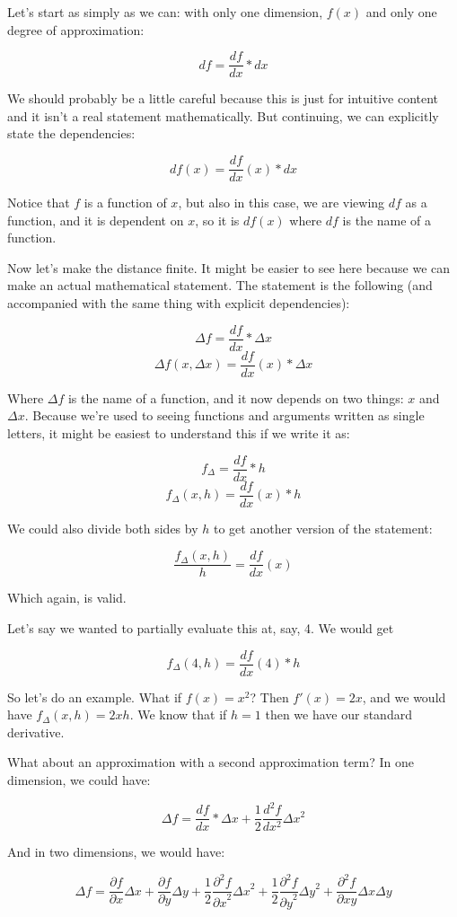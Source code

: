 \documentclass{article}
\begin{document}
Let's start as simply as we can: with only one dimension, $f(x)$ and only one degree of approximation:

$$df = \frac{df}{dx} * dx$$

We should probably be a little careful because this is just for intuitive content and it isn't a real statement mathematically.  But continuing, we can explicitly state the dependencies:

$$df(x) = \frac{df}{dx}(x) * dx$$

Notice that $f$ is a function of $x$, but also in this case, we are viewing $df$ as a function, and it is dependent on $x$, so it is $df(x)$ where $df$ is the name of a function.

Now let's make the distance finite. It might be easier to see here because we can make an actual mathematical statement.  The statement is the following (and accompanied with the same thing with explicit dependencies):

$$\Delta f = \frac{df}{dx} * \Delta x$$
$$\Delta f(x, \Delta x) = \frac{df}{dx}(x) * \Delta x$$

Where $\Delta f$ is the name of a function, and it now depends on two things: $x$ and $\Delta x$.  Because we're used to seeing functions and arguments written as single letters, it might be easiest to understand this if we write it as:

$$ f_\Delta = \frac{df}{dx} * h$$
$$ f_\Delta(x, h) = \frac{df}{dx}(x) * h$$



We could also divide both sides by $h$ to get another version of the statement:

$$\frac{ f_\Delta(x, h)}{h} = \frac{df}{dx}(x)$$

Which again, is valid. 

Let's say we wanted to partially evaluate this at, say, 4. We would get

$$ f_\Delta(4, h) = \frac{df}{dx}(4) * h$$

So let's do an example. What if $f(x) = x^2$?  Then $f'(x) = 2x$, and we would have $f_\Delta(x, h) = 2xh$.  We know that if $h = 1$ then we have our standard derivative.

What about an approximation with a second approximation term?  In one dimension, we could have:

$$\Delta f = \frac{df}{dx} * \Delta x + \frac{1}{2} \frac{d^2f}{dx^2} \Delta x ^2$$

And in two dimensions, we would have: 

$$\Delta f = \frac{\partial f}{\partial x} \Delta x + \frac{\partial f}{\partial y} \Delta y + \frac{1}{2}\frac{\partial^2 f}{{\partial x}^2} {\Delta x}^2 + \frac{1}{2}\frac{\partial^2 f}{{\partial y}^2} {\Delta y}^2 +  \frac{\partial^2 f}{\partial xy} \Delta x\Delta y$$
\end{document}
